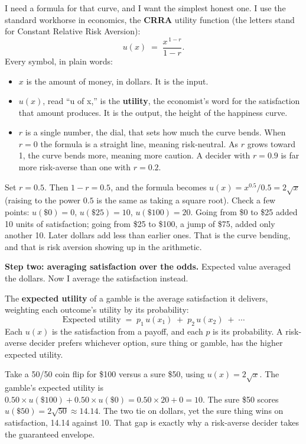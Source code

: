 \documentclass[11pt]{article}
\newcommand{\term}[1]{\textbf{\color{mossdk}#1}}
\begin{document}
I need a formula for that curve, and I want the simplest honest one. I use the standard workhorse in
economics, the \term{CRRA} utility function (the letters stand for Constant Relative Risk Aversion):
\[
u(x) \;=\; \frac{x^{\,1-r}}{1-r}.
\]
Every symbol, in plain words:
\begin{itemize}
\item $x$ is the amount of money, in dollars. It is the input.
\item $u(x)$, read ``u of x,'' is the \term{utility}, the economist's word for the satisfaction that
amount produces. It is the output, the height of the happiness curve.
\item $r$ is a single number, the dial, that sets how much the curve bends. When $r = 0$ the formula is
a straight line, meaning risk-neutral. As $r$ grows toward 1, the curve bends more, meaning more caution.
A decider with $r = 0.9$ is far more risk-averse than one with $r = 0.2$.
\end{itemize}

\begin{workbox}
Set $r = 0.5$. Then $1 - r = 0.5$, and the formula becomes $u(x) = x^{0.5}/0.5 = 2\sqrt{x}$ (raising to
the power $0.5$ is the same as taking a square root). Check a few points: $u(\$0) = 0$, $u(\$25) = 10$,
$u(\$100) = 20$. Going from \$0 to \$25 added 10 units of satisfaction; going from \$25 to \$100, a jump
of \$75, added only another 10. Later dollars add less than earlier ones. That is the curve bending, and
that is risk aversion showing up in the arithmetic.
\end{workbox}

\textbf{Step two: averaging satisfaction over the odds.} Expected value averaged the dollars. Now I
average the satisfaction instead.

\begin{defbox}
The \term{expected utility} of a gamble is the average satisfaction it delivers, weighting each
outcome's utility by its probability:
\[
\text{Expected utility} \;=\; p_1\, u(x_1) \;+\; p_2\, u(x_2) \;+\; \cdots
\]
Each $u(x)$ is the satisfaction from a payoff, and each $p$ is its probability. A risk-averse decider
prefers whichever option, sure thing or gamble, has the higher expected utility.
\end{defbox}

\begin{workbox}
Take a 50/50 coin flip for \$100 versus a sure \$50, using $u(x) = 2\sqrt{x}$. The gamble's expected
utility is $0.50 \times u(\$100) + 0.50 \times u(\$0) = 0.50 \times 20 + 0 = 10$. The sure \$50 scores
$u(\$50) = 2\sqrt{50} \approx 14.14$. The two tie on dollars, yet the sure thing wins on satisfaction,
14.14 against 10. That gap is exactly why a risk-averse decider takes the guaranteed envelope.
\end{workbox}
\end{document}

